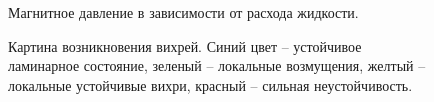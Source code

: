 \begin{figure}[h]
	\caption{Магнитное давление в зависимости от расхода жидкости.}
	\label{fig:pq_magnetic}
\end{figure}


\begin{figure}[h]
	\caption{Картина возникновения вихрей. Синий цвет -- устойчивое ламинарное состояние, зеленый -- локальные возмущения, желтый -- локальные устойчивые вихри, красный -- сильная неустойчивость.}
	\label{fig:map_instability}
\end{figure}



